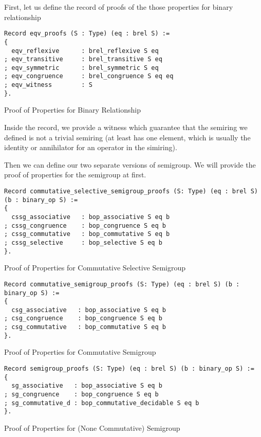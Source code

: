 First, let us define the record of proofs of the those properties for binary relationship
\begin{listing}[H]
\begin{verbatim}
Record eqv_proofs (S : Type) (eq : brel S) :=
{
  eqv_reflexive      : brel_reflexive S eq            
; eqv_transitive     : brel_transitive S eq           
; eqv_symmetric      : brel_symmetric S eq
; eqv_congruence     : brel_congruence S eq eq                                      
; eqv_witness        : S                                      
}.
\end{verbatim}
\caption{Proof of Properties for Binary Relationship} 
\label{coq:def:eqv_proofs}
\end{listing}
Inside the record, we provide a witness which guarantee that the semiring we defined is not a trivial semiring (at least has one element, which is usually the identity or annihilator for an operator in the simiring).

Then we can define our two separate versions of semigroup. We will provide the proof of properties for the semigroup at first.
\begin{listing}[H]
\begin{verbatim}
Record commutative_selective_semigroup_proofs (S: Type) (eq : brel S) (b : binary_op S) := 
{
  cssg_associative   : bop_associative S eq b
; cssg_congruence    : bop_congruence S eq b
; cssg_commutative   : bop_commutative S eq b
; cssg_selective     : bop_selective S eq b                                                                            
}.
\end{verbatim}
\caption{Proof of Properties for Commutative Selective Semigroup} 
\label{coq:def:commutative_selective_semigroup_proofs}
\end{listing}

\begin{listing}[H]
\begin{verbatim}
Record commutative_semigroup_proofs (S: Type) (eq : brel S) (b : binary_op S) := 
{
  csg_associative   : bop_associative S eq b
; csg_congruence    : bop_congruence S eq b
; csg_commutative   : bop_commutative S eq b                                      
}.
\end{verbatim}
\caption{Proof of Properties for Commutative Semigroup} 
\label{coq:def:commutative_semigroup_proofs}
\end{listing}

\begin{listing}[H]
\begin{verbatim}
Record semigroup_proofs (S: Type) (eq : brel S) (b : binary_op S) := 
{
  sg_associative   : bop_associative S eq b
; sg_congruence    : bop_congruence S eq b
; sg_commutative_d : bop_commutative_decidable S eq b                                      
}.
\end{verbatim}
\caption{Proof of Properties for (None Commutative) Semigroup} 
\label{coq:def:semigroup_proofs}
\end{listing}

